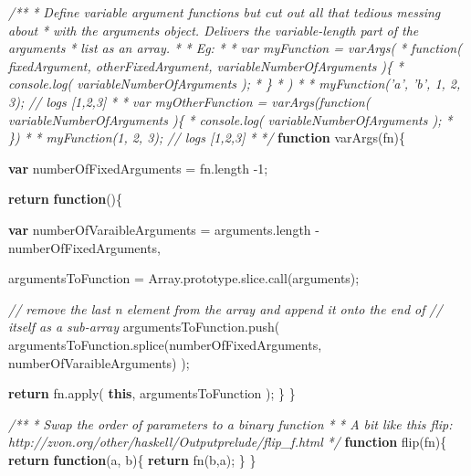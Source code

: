 \documentclass[]{article}
\newenvironment{Shaded}{}{}
\newcommand{\KeywordTok}[1]{\textcolor[rgb]{0.00,0.44,0.13}{\textbf{{#1}}}}
\newcommand{\DecValTok}[1]{\textcolor[rgb]{0.25,0.63,0.44}{{#1}}}
\newcommand{\CommentTok}[1]{\textcolor[rgb]{0.38,0.63,0.69}{\textit{{#1}}}}
\newcommand{\OtherTok}[1]{\textcolor[rgb]{0.00,0.44,0.13}{{#1}}}
\newcommand{\FunctionTok}[1]{\textcolor[rgb]{0.02,0.16,0.49}{{#1}}}
\newcommand{\NormalTok}[1]{{#1}}
\begin{document}
\begin{Shaded}
\begin{Highlighting}[]
\CommentTok{/**}
\CommentTok{ * Define variable argument functions but cut out all that tedious messing about }
\CommentTok{ * with the arguments object. Delivers the variable-length part of the arguments}
\CommentTok{ * list as an array.}
\CommentTok{ * }
\CommentTok{ * Eg:}
\CommentTok{ * }
\CommentTok{ * var myFunction = varArgs(}
\CommentTok{ *    function( fixedArgument, otherFixedArgument, variableNumberOfArguments )\{}
\CommentTok{ *       console.log( variableNumberOfArguments );}
\CommentTok{ *    \}}
\CommentTok{ * )}
\CommentTok{ * }
\CommentTok{ * myFunction('a', 'b', 1, 2, 3); // logs [1,2,3]}
\CommentTok{ * }
\CommentTok{ * var myOtherFunction = varArgs(function( variableNumberOfArguments )\{}
\CommentTok{ *    console.log( variableNumberOfArguments );}
\CommentTok{ * \})}
\CommentTok{ * }
\CommentTok{ * myFunction(1, 2, 3); // logs [1,2,3]}
\CommentTok{ * }
\CommentTok{ */}
\KeywordTok{function} \FunctionTok{varArgs}\NormalTok{(fn)\{}

   \KeywordTok{var} \NormalTok{numberOfFixedArguments = }\OtherTok{fn}\NormalTok{.}\FunctionTok{length} \NormalTok{-}\DecValTok{1}\NormalTok{;}
         
   \KeywordTok{return} \KeywordTok{function}\NormalTok{()\{}
   
      \KeywordTok{var} \NormalTok{numberOfVaraibleArguments = }\OtherTok{arguments}\NormalTok{.}\FunctionTok{length} \NormalTok{- numberOfFixedArguments,}
      
          \NormalTok{argumentsToFunction = }\OtherTok{Array}\NormalTok{.}\OtherTok{prototype}\NormalTok{.}\OtherTok{slice}\NormalTok{.}\FunctionTok{call}\NormalTok{(arguments);}
          
      \CommentTok{// remove the last n element from the array and append it onto the end of}
      \CommentTok{// itself as a sub-array}
      \OtherTok{argumentsToFunction}\NormalTok{.}\FunctionTok{push}\NormalTok{( }
         \OtherTok{argumentsToFunction}\NormalTok{.}\FunctionTok{splice}\NormalTok{(numberOfFixedArguments, numberOfVaraibleArguments)}
      \NormalTok{);   }
      
      \KeywordTok{return} \OtherTok{fn}\NormalTok{.}\FunctionTok{apply}\NormalTok{( }\KeywordTok{this}\NormalTok{, argumentsToFunction );}
   \NormalTok{\}       }
\NormalTok{\}}


\CommentTok{/**}
\CommentTok{ * Swap the order of parameters to a binary function}
\CommentTok{ * }
\CommentTok{ * A bit like this flip: http://zvon.org/other/haskell/Outputprelude/flip_f.html}
\CommentTok{ */}
\KeywordTok{function} \FunctionTok{flip}\NormalTok{(fn)\{}
   \KeywordTok{return} \KeywordTok{function}\NormalTok{(a, b)\{}
      \KeywordTok{return} \FunctionTok{fn}\NormalTok{(b,a);}
   \NormalTok{\}}
\NormalTok{\}}



\end{Highlighting}
\end{Shaded}
\end{document}
